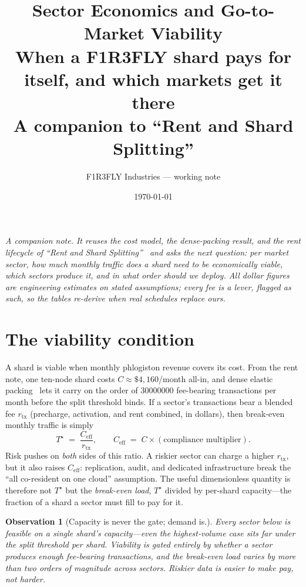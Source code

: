 \documentclass[11pt]{article}
\title{\color{f1r3red}\bfseries Sector Economics and Go-to-Market Viability\\[2pt]
\large\color{f1r3ink}\mdseries When a F1R3FLY shard pays for itself, and which markets get it there\\[2pt]
\normalsize\color{f1r3ash}\mdseries A companion to ``Rent and Shard Splitting''}
\author{\normalsize F1R3FLY Industries --- working note}
\date{\normalsize \today}
\newtheorem{observation}{Observation}
\begin{document}
\maketitle

\noindent\textit{A companion note. It reuses the cost model, the dense-packing result, and the rent lifecycle of ``Rent and Shard Splitting''~\cite{rentnote} and asks the next question: per market sector, how much monthly traffic does a shard need to be economically viable, which sectors produce it, and in what order should we deploy. All dollar figures are engineering estimates on stated assumptions; every fee is a lever, flagged as such, so the tables re-derive when real schedules replace ours.}

\section{The viability condition}
\label{sec:viability}

A shard is viable when monthly phlogiston revenue covers its cost. From the rent note, one ten-node shard costs $C \approx \$4{,}160$/month all-in, and dense elastic packing~\cite{fkk2025} lets it carry on the order of $\num{30000000}$ fee-bearing transactions per month before the split threshold binds. If a sector's transactions bear a blended fee $r_{\text{tx}}$ (precharge, activation, and rent combined, in dollars), then break-even monthly traffic is simply
\[
  T^\star \;=\; \frac{C_{\text{eff}}}{r_{\text{tx}}},
  \qquad
  C_{\text{eff}} \;=\; C \times (\text{compliance multiplier}).
\]
Risk pushes on \emph{both} sides of this ratio. A riskier sector can charge a higher $r_{\text{tx}}$, but it also raises $C_{\text{eff}}$: replication, audit, and dedicated infrastructure break the ``all co-resident on one cloud'' assumption. The useful dimensionless quantity is therefore not $T^\star$ but the \emph{break-even load}, $T^\star$ divided by per-shard capacity---the fraction of a shard a sector must fill to pay for it.

\begin{observation}[Capacity is never the gate; demand is.]
Every sector below is feasible on a single shard's \emph{capacity}---even the highest-volume case sits far under the split threshold per shard. Viability is gated entirely by whether a sector produces enough fee-bearing transactions, and the break-even load varies by more than two orders of magnitude across sectors. Riskier data is \emph{easier} to make pay, not harder.
\end{observation}
\end{document}

